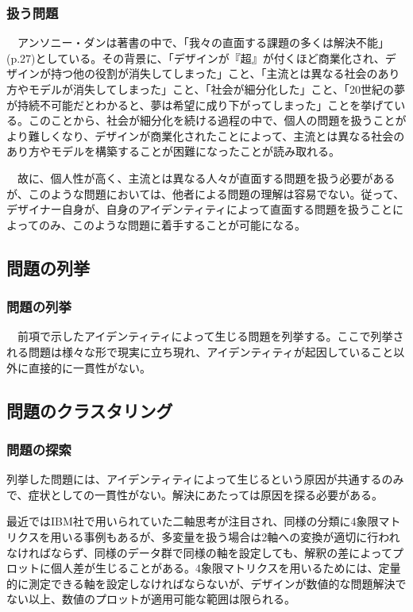 \documentclass{jsarticle}
\begin{document}
\subsubsection{扱う問題}
　アンソニー・ダンは著書の中で、「我々の直面する課題の多くは解決不能」(p.27)としている。その背景に、「デザインが『超』が付くほど商業化され、デザインが持つ他の役割が消失してしまった」こと、「主流とは異なる社会のあり方やモデルが消失してしまった」こと、「社会が細分化した」こと、「20世紀の夢が持続不可能だとわかると、夢は希望に成り下がってしまった」ことを挙げている。このことから、社会が細分化を続ける過程の中で、個人の問題を扱うことがより難しくなり、デザインが商業化されたことによって、主流とは異なる社会のあり方やモデルを構築することが困難になったことが読み取れる。

　故に、個人性が高く、主流とは異なる人々が直面する問題を扱う必要があるが、このような問題においては、他者による問題の理解は容易でない。従って、デザイナー自身が、自身のアイデンティティによって直面する問題を扱うことによってのみ、このような問題に着手することが可能になる。

\newpage
\subsection{問題の列挙}

\subsubsection{問題の列挙}
　前項で示したアイデンティティによって生じる問題を列挙する。ここで列挙される問題は様々な形で現実に立ち現れ、アイデンティティが起因していること以外に直接的に一貫性がない。

\newpage
\subsection{問題のクラスタリング}

\subsubsection{問題の探索}
列挙した問題には、アイデンティティによって生じるという原因が共通するのみで、症状としての一貫性がない。解決にあたっては原因を探る必要がある。

最近ではIBM社で用いられていた二軸思考が注目され、同様の分類に4象限マトリクスを用いる事例もあるが、多変量を扱う場合は2軸への変換が適切に行われなければならず、同様のデータ群で同様の軸を設定しても、解釈の差によってプロットに個人差が生じることがある。4象限マトリクスを用いるためには、定量的に測定できる軸を設定しなければならないが、デザインが数値的な問題解決でない以上、数値のプロットが適用可能な範囲は限られる。
\end{document}
